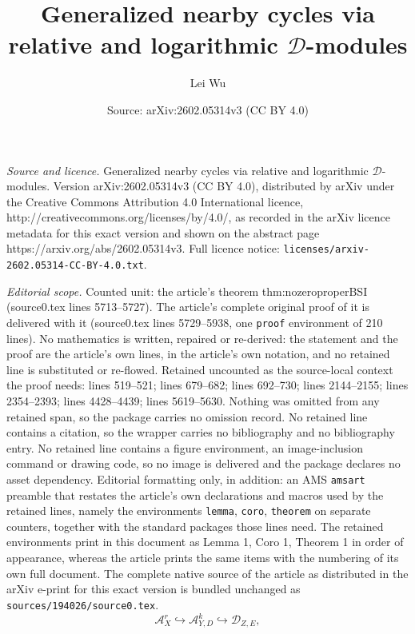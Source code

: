 \documentclass[10pt,a4paper]{amsart}
\title{Generalized nearby cycles via relative and logarithmic $\mathscr{D}$-modules}
\author{Lei Wu}
\date{Source: arXiv:2602.05314v3 (CC BY 4.0)}
\newcommand{\sA}{\mathscr{A}}
\newcommand{\shD}{\mathscr{D}}
\begin{document}
\maketitle

\noindent\emph{Source and licence.} Generalized nearby cycles via relative and logarithmic $\mathscr{D}$-modules. Version arXiv:2602.05314v3 (CC BY 4.0), distributed by arXiv under the Creative Commons Attribution 4.0 International licence, http://creativecommons.org/licenses/by/4.0/, as recorded in the arXiv licence metadata for this exact version and shown on the abstract page https://arxiv.org/abs/2602.05314v3. Full licence notice: \texttt{licenses/arxiv-2602.05314-CC-BY-4.0.txt}.\par\smallskip

\noindent\textit{Editorial scope.} Counted unit: the article's theorem thm:nozeroproperBSI (source0.tex lines 5713--5727). The article's complete original proof of it is delivered with it (source0.tex lines 5729--5938, one \texttt{proof} environment of 210 lines). No mathematics is written, repaired or re-derived: the statement and the proof are the article's own lines, in the article's own notation, and no retained line is substituted or re-flowed.  Retained uncounted as the source-local context the proof needs: lines 519--521; lines 679--682; lines 692--730; lines 2144--2155; lines 2354--2393; lines 4428--4439; lines 5619--5630.  Nothing was omitted from any retained span, so the package carries no omission record.  No retained line contains a citation, so the wrapper carries no bibliography and no bibliography entry.  No retained line contains a figure environment, an image-inclusion command or drawing code, so no image is delivered and the package declares no asset dependency.  Editorial formatting only, in addition: an AMS \texttt{amsart} preamble that restates the article's own declarations and macros used by the retained lines, namely the environments \texttt{lemma}, \texttt{coro}, \texttt{theorem} on separate counters, together with the standard packages those lines need.  The retained environments print in this document as Lemma 1, Coro 1, Theorem 1 in order of appearance, whereas the article prints the same items with the numbering of its own full document.  The complete native source of the article as distributed in the arXiv e-print for this exact version is bundled unchanged as \texttt{sources/194026/source0.tex}.
\begin{equation}\label{eq:uncanincl}
    \sA_X^r\hookrightarrow \sA_{Y,D}^k\hookrightarrow \shD_{Z,E},
\end{equation}
\end{document}
